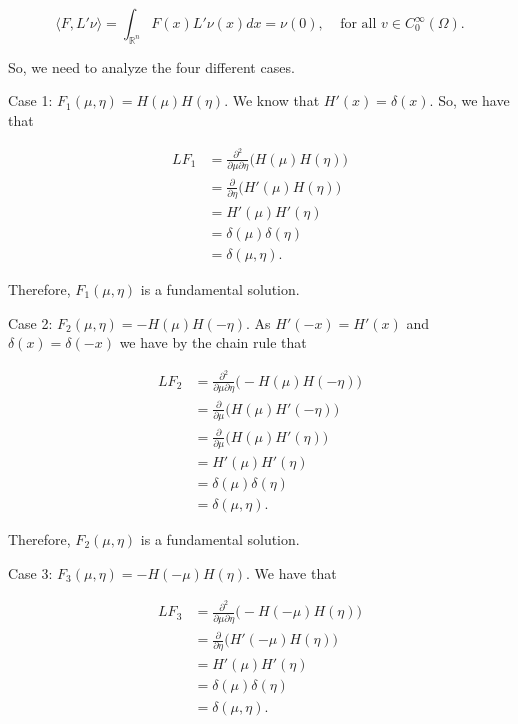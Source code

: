 \documentclass{article}
\begin{document}
$$\langle F,L'\nu\rangle=\int_{\mathbb R^n}F(x)L'\nu(x)dx=\nu(0),~~~~~\text{for all $v\in C_0^\infty(\Omega)$}.$$

So, we need to analyze the four different cases.

Case 1: $F_1(\mu,\eta)=H(\mu)H(\eta)$. We know that $H'(x)=\delta(x)$. So, we have that

\begin{equation*}
\begin{split}
LF_1 &= \frac{\partial^2}{\partial\mu\partial\eta}\Big(H(\mu)H(\eta)\Big)\\&= 
\frac{\partial}{\partial\eta}\Big(H'(\mu)H(\eta)\Big) \\&= 
H'(\mu)H'(\eta) \\&=
\delta(\mu)\delta(\eta) \\&=
\delta(\mu,\eta).
\end{split}
\end{equation*}

Therefore, $F_1(\mu,\eta)$ is a fundamental solution.

Case 2: $F_2(\mu,\eta)=-H(\mu)H(-\eta)$. As $H'(-x)=H'(x)$ and $\delta(x)=\delta(-x)$ we have by the chain rule that

\begin{equation*}
\begin{split}
LF_2 &= \frac{\partial^2}{\partial\mu\partial\eta}\Big(-H(\mu)H(-\eta)\Big)\\&= 
\frac{\partial}{\partial\mu}\Big(H(\mu)H'(-\eta)\Big) \\&= 
\frac{\partial}{\partial\mu}\Big(H(\mu)H'(\eta)\Big) \\&= 
H'(\mu)H'(\eta) \\&=
\delta(\mu)\delta(\eta) \\&=
\delta(\mu,\eta).
\end{split}
\end{equation*}

Therefore, $F_2(\mu,\eta)$ is a fundamental solution.

Case 3: $F_3(\mu,\eta)=-H(-\mu)H(\eta)$. We have that

\begin{equation*}
\begin{split}
LF_3 &= \frac{\partial^2}{\partial\mu\partial\eta}\Big(-H(-\mu)H(\eta)\Big)\\&= 
\frac{\partial}{\partial\eta}\Big(H'(-\mu)H(\eta)\Big) \\&= 
H'(\mu)H'(\eta) \\&=
\delta(\mu)\delta(\eta) \\&=
\delta(\mu,\eta).
\end{split}
\end{equation*}
\end{document}
